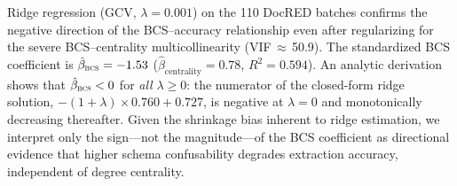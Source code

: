 
Ridge regression (GCV, $\lambda = 0.001$) on the 110 DocRED batches confirms
the negative direction of the BCS--accuracy relationship even after
regularizing for the severe BCS--centrality multicollinearity
(VIF\,$\approx$\,50.9).
The standardized BCS coefficient is $\hat{\beta}_{\textsc{bcs}} = -1.53$
($\hat{\beta}_{\text{centrality}} = 0.78$, $R^2 = 0.594$).
An analytic derivation shows that $\hat{\beta}_{\textsc{bcs}} < 0$ for
\emph{all} $\lambda \geq 0$: the numerator of the closed-form ridge
solution, $-(1{+}\lambda) \times 0.760 + 0.727$, is negative at
$\lambda{=}0$ and monotonically decreasing thereafter.
Given the shrinkage bias inherent to ridge estimation, we interpret only
the sign---not the magnitude---of the BCS coefficient as directional
evidence that higher schema confusability degrades extraction accuracy,
independent of degree centrality.
